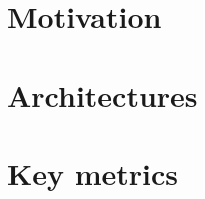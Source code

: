 \documentclass{article}
\begin{document}
\section{Motivation}

\section{Architectures}

\section{Key metrics}


\end{document}
